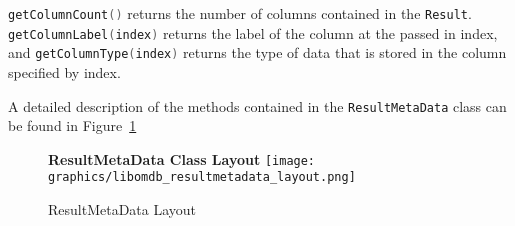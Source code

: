 \documentclass[letterpaper, 11pt]{article}
\newcommand{\inlinecode}[1]{\colorbox{codegrey}{\lstinline[language=C++]{#1}}}
\begin{document}
  \inlinecode{getColumnCount()} returns the number of
  columns contained in the \inlinecode{Result}.
  \inlinecode{getColumnLabel(index)} returns the label of the
  column at the passed in index, and
  \inlinecode{getColumnType(index)} returns the type of data that
  is stored in the column specified by index.
  \par\vspace{\baselineskip}
  A detailed description of the methods contained in the \inlinecode{ResultMetaData}
  class can be found in Figure~\ref{fig:reultmetadata_methods}
  \begin{figure}[H]
    \centering
    \textbf{ResultMetaData Class Layout}
    \texttt{[image: graphics/libomdb\_resultmetadata\_layout.png]}
    \caption{ResultMetaData Layout}
    \label{fig:reultmetadata_methods}
  \end{figure}

  \newpage
\end{document}
